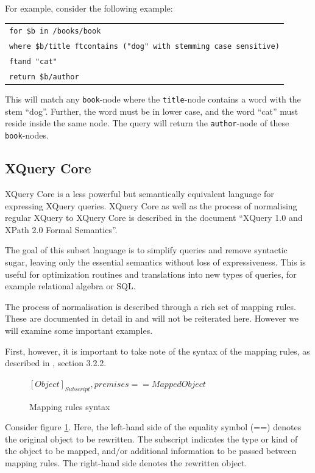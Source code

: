 For example, consider the following example:
\begin{center}
\begin{tabular}{l}
\texttt{for \$b in /books/book} \\
\texttt{where \$b/title ftcontains ("dog" with stemming case sensitive)} \\ \quad\quad\quad
\texttt{ftand "cat"} \\
\texttt{return \$b/author}
\end{tabular}
\end{center}
This will match any \texttt{book}-node where the \texttt{title}-node contains a word with the stem ``dog''.
Further, the word must be in lower case, and the word ``cat'' must reside inside the same node. The query will
return the \texttt{author}-node of these \texttt{book}-nodes. 

\subsection{XQuery Core}
\label{sect:theory:xquery:XQcore}
XQuery Core is a less powerful but semantically equivalent language for expressing
XQuery queries. XQuery Core as well as the process of normalising regular
XQuery to XQuery Core is described in the document ``XQuery 1.0 and XPath 2.0
Formal Semantics''\cite{xquery_semantics}.

The goal of this subset language is to simplify queries and remove syntactic sugar,
leaving only the essential semantics without loss of expressiveness.
This is useful for optimization routines and translations into new types of
queries, for example relational algebra or SQL.

The process of normalisation is described through a rich set of mapping
rules. These are documented in detail in \cite{xquery_semantics} and will not be reiterated here.
However we will examine some important examples.

First, however, it is important to take note of the syntax of the mapping
rules, as described in \cite{xquery_semantics}, section 3.2.2. 
 
\begin{figure}[!h]
  \centering
$
[Object]_{Subscript}, premises == Mapped Object
$
  \caption{Mapping rules syntax}
  \label{figure:xquery:mapping_rules}
\end{figure}

Consider figure \ref{figure:xquery:mapping_rules}. Here, the left-hand side of the
equality symbol (==) denotes the original object to be rewritten. The
subscript indicates the type or kind of the object to be mapped, and/or
additional information to be passed between mapping rules. The right-hand side
denotes the rewritten object.

